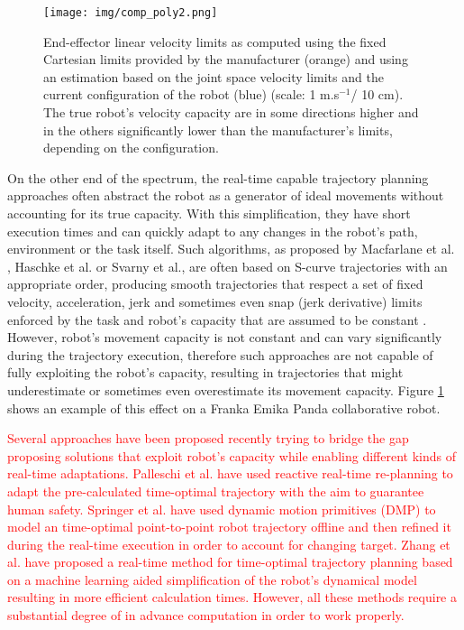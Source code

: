 \begin{figure}[!t]
    \centering
    \texttt{[image: img/comp\_poly2.png]}
    \caption{End-effector linear velocity limits as computed using the fixed Cartesian limits provided by the manufacturer (orange) and using an estimation based on the joint space velocity limits and the current configuration of the robot (blue) (scale: 1 m.s$^{-1}$/ 10 cm). The true robot's velocity capacity are in some directions higher and in the others significantly lower than the manufacturer's limits, depending on the configuration.}
    \label{fig:comp_cube_poly}
\end{figure}



On the other end of the spectrum, the real-time capable trajectory planning approaches often abstract the robot as a generator of ideal movements without accounting for its true capacity. With this simplification, they have short execution times and can quickly adapt to any changes in the robot's path, environment or the task itself. Such algorithms, as proposed by Macfarlane et al. \cite{Macfarlane2003}, Haschke et al. \cite{haschke2008line} or Svarny et al.\cite{Svarny2022}, are often based on S-curve trajectories \cite{FANG2019} with an appropriate order, producing smooth trajectories that respect a set of fixed velocity, acceleration, jerk and sometimes even snap (jerk derivative) limits enforced by the task and robot's capacity that are assumed to be constant \cite{modernrobotics}. However, robot's movement capacity is not constant and can vary significantly during the trajectory execution, therefore such approaches are not capable of fully exploiting the robot's capacity, resulting in trajectories that might underestimate or sometimes even overestimate its movement capacity. Figure \ref{fig:comp_cube_poly} shows an example of this effect on a Franka Emika Panda collaborative robot.


\textcolor{red}{
Several approaches have been proposed recently trying to bridge the gap proposing solutions that exploit robot's capacity while enabling different kinds of real-time adaptations. Palleschi et al.\cite{Palleschi2021} have used reactive real-time re-planning to adapt the pre-calculated time-optimal trajectory with the aim to guarantee human safety. Springer et al. \cite{dmp2014} have used dynamic motion primitives (DMP) to model an time-optimal point-to-point robot trajectory offline and then refined it during the real-time execution in order to account for changing target. Zhang et al. \cite{ZHANG2020} have proposed a real-time method for time-optimal trajectory planning based on a machine learning aided simplification of the robot's dynamical model resulting in more efficient calculation times. However, all these methods require a substantial degree of in advance computation in order to work properly.
}

